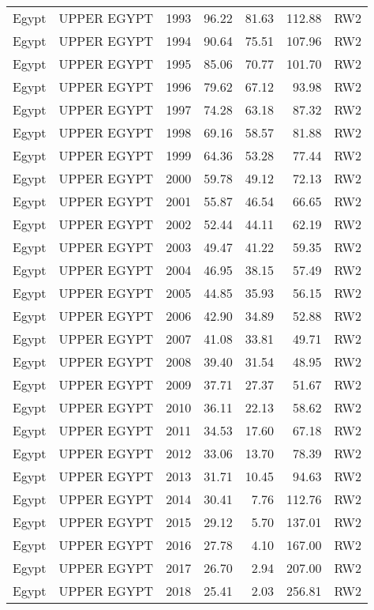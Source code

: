 \begin{longtable}{lllrrrl}
  Egypt & UPPER EGYPT & 1993 & 96.22 & 81.63 & 112.88 & RW2 \\ 
  Egypt & UPPER EGYPT & 1994 & 90.64 & 75.51 & 107.96 & RW2 \\ 
  Egypt & UPPER EGYPT & 1995 & 85.06 & 70.77 & 101.70 & RW2 \\ 
  Egypt & UPPER EGYPT & 1996 & 79.62 & 67.12 & 93.98 & RW2 \\ 
  Egypt & UPPER EGYPT & 1997 & 74.28 & 63.18 & 87.32 & RW2 \\ 
  Egypt & UPPER EGYPT & 1998 & 69.16 & 58.57 & 81.88 & RW2 \\ 
  Egypt & UPPER EGYPT & 1999 & 64.36 & 53.28 & 77.44 & RW2 \\ 
  Egypt & UPPER EGYPT & 2000 & 59.78 & 49.12 & 72.13 & RW2 \\ 
  Egypt & UPPER EGYPT & 2001 & 55.87 & 46.54 & 66.65 & RW2 \\ 
  Egypt & UPPER EGYPT & 2002 & 52.44 & 44.11 & 62.19 & RW2 \\ 
  Egypt & UPPER EGYPT & 2003 & 49.47 & 41.22 & 59.35 & RW2 \\ 
  Egypt & UPPER EGYPT & 2004 & 46.95 & 38.15 & 57.49 & RW2 \\ 
  Egypt & UPPER EGYPT & 2005 & 44.85 & 35.93 & 56.15 & RW2 \\ 
  Egypt & UPPER EGYPT & 2006 & 42.90 & 34.89 & 52.88 & RW2 \\ 
  Egypt & UPPER EGYPT & 2007 & 41.08 & 33.81 & 49.71 & RW2 \\ 
  Egypt & UPPER EGYPT & 2008 & 39.40 & 31.54 & 48.95 & RW2 \\ 
  Egypt & UPPER EGYPT & 2009 & 37.71 & 27.37 & 51.67 & RW2 \\ 
  Egypt & UPPER EGYPT & 2010 & 36.11 & 22.13 & 58.62 & RW2 \\ 
  Egypt & UPPER EGYPT & 2011 & 34.53 & 17.60 & 67.18 & RW2 \\ 
  Egypt & UPPER EGYPT & 2012 & 33.06 & 13.70 & 78.39 & RW2 \\ 
  Egypt & UPPER EGYPT & 2013 & 31.71 & 10.45 & 94.63 & RW2 \\ 
  Egypt & UPPER EGYPT & 2014 & 30.41 & 7.76 & 112.76 & RW2 \\ 
  Egypt & UPPER EGYPT & 2015 & 29.12 & 5.70 & 137.01 & RW2 \\ 
  Egypt & UPPER EGYPT & 2016 & 27.78 & 4.10 & 167.00 & RW2 \\ 
  Egypt & UPPER EGYPT & 2017 & 26.70 & 2.94 & 207.00 & RW2 \\ 
  Egypt & UPPER EGYPT & 2018 & 25.41 & 2.03 & 256.81 & RW2 \\ 

\end{longtable}
